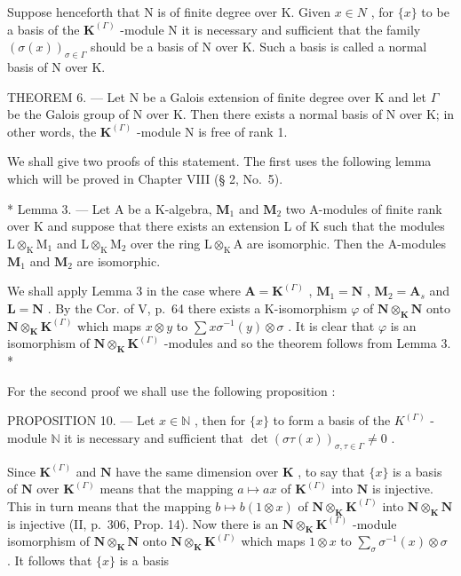 Suppose henceforth that N is of finite degree over K. Given \(x \in N\) , for \(\{x\}\) to be a basis of the \(\mathbf{K}^{(\Gamma)}\) -module N it is necessary and sufficient that the family \((\sigma(x))_{\sigma \in \Gamma}\) should be a basis of N over K. Such a basis is called a normal basis of N over K.

THEOREM 6. --- Let N be a Galois extension of finite degree over K and let \(\Gamma\) be the Galois group of N over K. Then there exists a normal basis of N over K; in other words, the \(\mathbf{K}^{(\Gamma)}\) -module N is free of rank 1.

We shall give two proofs of this statement. The first uses the following lemma which will be proved in Chapter VIII (§ 2, No.~5).

* Lemma 3. --- Let A be a K-algebra, \(\mathbf{M}_1\) and \(\mathbf{M}_2\) two A-modules of finite rank over K and suppose that there exists an extension L of K such that the modules \(\mathrm{L} \otimes_{\mathrm{K}} \mathrm{M}_1\) and \(\mathrm{L} \otimes_{\mathrm{K}} \mathrm{M}_2\) over the ring \(\mathrm{L} \otimes_{\mathrm{K}} \mathrm{A}\) are isomorphic. Then the A-modules \(\mathbf{M}_1\) and \(\mathbf{M}_2\) are isomorphic.

We shall apply Lemma 3 in the case where \(\mathbf{A} = \mathbf{K}^{(\Gamma)}\) , \(\mathbf{M}_1 = \mathbf{N}\) , \(\mathbf{M}_2 = \mathbf{A}_s\) and \(\mathbf{L} = \mathbf{N}\) . By the Cor. of V, p.~64 there exists a K-isomorphism \(\varphi\) of \(\mathbf{N} \otimes_{\mathbf{K}} \mathbf{N}\) onto \(\mathbf{N} \otimes_{\mathbf{K}} \mathbf{K}^{(\Gamma)}\) which maps \(x \otimes y\) to \(\sum x \sigma^{-1}(y) \otimes \sigma\) . It is clear that \(\varphi\) is an isomorphism of \(\mathbf{N} \otimes_{\mathbf{K}} \mathbf{K}^{(\Gamma)}\) -modules and so the theorem follows from Lemma 3. *

For the second proof we shall use the following proposition :

PROPOSITION 10. --- Let \(x \in \mathbb{N}\) , then for \(\{x\}\) to form a basis of the \(K^{(\Gamma)}\) -module \(\mathbb{N}\) it is necessary and sufficient that \(\det(\sigma\tau(x))_{\sigma,\tau \in \Gamma} \neq 0\) .

Since \(\mathbf{K}^{(\Gamma)}\) and \(\mathbf{N}\) have the same dimension over \(\mathbf{K}\) , to say that \(\{x\}\) is a basis of \(\mathbf{N}\) over \(\mathbf{K}^{(\Gamma)}\) means that the mapping \(a \mapsto ax\) of \(\mathbf{K}^{(\Gamma)}\) into \(\mathbf{N}\) is injective. This in turn means that the mapping \(b \mapsto b(1 \otimes x)\) of \(\mathbf{N} \otimes_{\mathbf{K}} \mathbf{K}^{(\Gamma)}\) into \(\mathbf{N} \otimes_{\mathbf{K}} \mathbf{N}\) is injective (II, p.~306, Prop. 14). Now there is an \(\mathbf{N} \otimes_{\mathbf{K}} \mathbf{K}^{(\Gamma)}\) -module isomorphism of \(\mathbf{N} \otimes_{\mathbf{K}} \mathbf{N}\) onto \(\mathbf{N} \otimes_{\mathbf{K}} \mathbf{K}^{(\Gamma)}\) which maps \(1 \otimes x\) to \(\sum_{\sigma} \sigma^{-1}(x) \otimes \sigma\) . It follows that \(\{x\}\) is a basis

